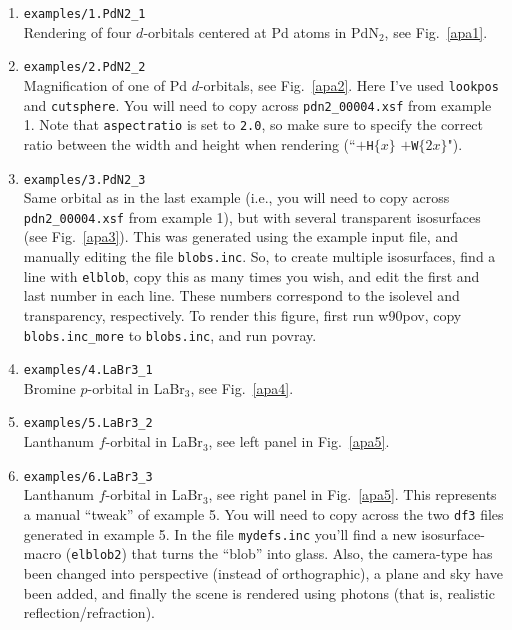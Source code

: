 \documentclass[
  notitlepage,
  twoside,
   prb,
  floatfix,
]{revtex4-1}
\newcommand{\fig}[1]{Fig.~\ref{#1}}
\begin{document}
\begin{enumerate}
\item {\tt examples/1.PdN2\_1} \\
Rendering of four $d$-orbitals centered at Pd atoms in PdN$_2$, see \fig{apa1}.

\item {\tt examples/2.PdN2\_2} \\
Magnification of one of Pd $d$-orbitals, see \fig{apa2}. Here I've used {\tt lookpos} and {\tt cutsphere}. You will need to copy across {\tt pdn2\_00004.xsf} from example 1. Note that {\tt aspectratio} is set to {\tt 2.0}, so make sure to specify the correct ratio between the width and height when rendering (``$+${\tt H}$\{x\}$ $+${\tt W}$\{2x\}$").

\item {\tt examples/3.PdN2\_3} \\
Same orbital as in the last example (i.e., you will need to copy across {\tt pdn2\_00004.xsf} from example 1), but with several transparent isosurfaces (see \fig{apa3}). This was generated using the example input file, and manually editing the file {\tt blobs.inc}. So, to create multiple isosurfaces, find a line with {\tt elblob}, copy this as many times you wish, and edit the first and last number in each line. These numbers correspond to the isolevel and transparency, respectively. To render this figure, first run \textsf{w90pov}, copy {\tt blobs.inc\_more} to {\tt blobs.inc}, and run \textsf{povray}.

\item {\tt examples/4.LaBr3\_1} \\
Bromine $p$-orbital in LaBr$_3$, see \fig{apa4}.

\item {\tt examples/5.LaBr3\_2} \\
Lanthanum $f$-orbital in LaBr$_3$, see left panel in \fig{apa5}.
\item {\tt examples/6.LaBr3\_3} \\
Lanthanum $f$-orbital in LaBr$_3$, see right panel in \fig{apa5}. This represents a manual ``tweak'' of example 5. You will need to copy across the two {\tt df3} files generated in example 5. In the file {\tt mydefs.inc} you'll find a new isosurface-macro ({\tt elblob2}) that turns the ``blob'' into glass. Also, the camera-type has been changed into perspective (instead of orthographic), a plane and sky have been added, and finally the scene is rendered using photons (that is, realistic reflection/refraction).
\end{enumerate}
\end{document}

